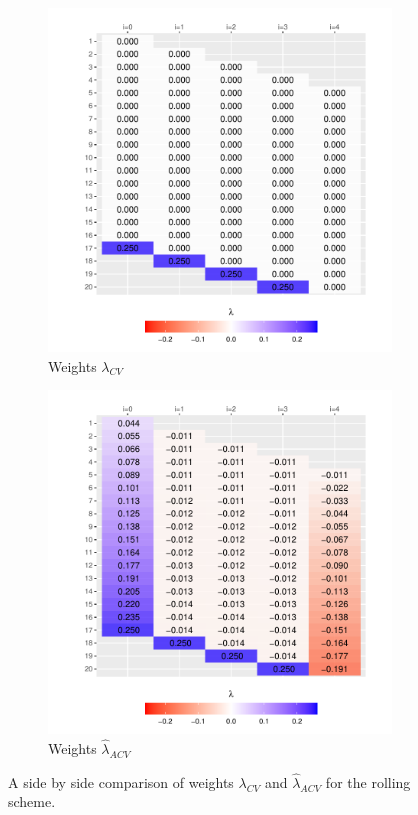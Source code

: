\documentclass[11pt,dvipsnames]{article}
\begin{document}
\begin{figure}[!htbp]
\centering
\begin{subfigure}{.5\textwidth}
  \centering
  \includegraphics[width=.95\linewidth]{../../Scripts/Illustration/Outputs/Illustration_v1_CV_Article.pdf}
  \caption{Weights $ \lambda_{CV} $}
\end{subfigure}%
\begin{subfigure}{.5\textwidth}
  \centering
  \includegraphics[width=.95\linewidth]{../../Scripts/Illustration/Outputs/Illustration_v1_ACV_Article.pdf}
  \caption{Weights $ \widehat{\lambda}_{ACV} $}
\end{subfigure}
  \caption{A side by side comparison of weights $ \lambda_{CV} $ and $ \widehat{\lambda}_{ACV} $ for the rolling scheme.}
  \label{fig:Illustrationv1} 
\end{figure}
\end{document}
